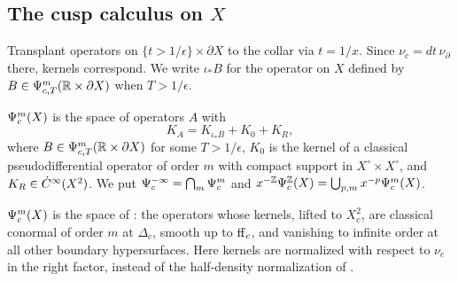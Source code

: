 \subsection{The cusp calculus on \texorpdfstring{\(X\)}{X}}
\label{cc:subsec:global}
Transplant operators on \(\{t>1/\epsilon\}\times\partial X\) to the
collar via \(t=1/x\). Since \(\nu_c=dt\,\nu_\partial\) there, kernels
correspond. We write \(\iota_*B\) for the operator on \(X\) defined by
\(B\in\Psi_{c,T}^m(\mathbb R\times\partial X)\) when \(T>1/\epsilon\).

\begin{definition}\label{cc:def:Psic}
\(\Psi_{c}^m(X)\) is the space of operators \(A\) with
\[
 K_A=K_{\iota_*B}+K_0+K_R ,
\]
where \(B\in\Psi_{c,T}^m(\mathbb R\times\partial X)\) for some \(T>1/\epsilon\),
\(K_0\) is the kernel of a classical pseudodifferential operator of order
\(m\) with compact support in \(X^\circ\times X^\circ\), and
\(K_R\in\dot C^\infty(X^2)\). We put \(\Psi_{c}^{-\infty}=\bigcap_m\Psi_{c}^m\) and
\(x^{-\mathbb Z}\Psi_{c}^{\mathbb Z}(X)=\bigcup_{p,m}x^{-p}\Psi_{c}^m(X)\).
\end{definition}

\begin{proposition}\label{cc:prop:MNdef}
\(\Psi_{c}^m(X)\) is the space of \cite[Def.~2]{MN}: the operators whose
kernels, lifted to \(X_c^2\), are classical conormal of order \(m\) at
\(\Delta_c\), smooth up to \(\mathrm{ff}_c\), and vanishing to infinite order at
all other boundary hypersurfaces. Here kernels are normalized with respect
to \(\nu_c\) in the right factor, instead of the half-density
normalization of \cite[(118)]{MN}.
\end{proposition}

